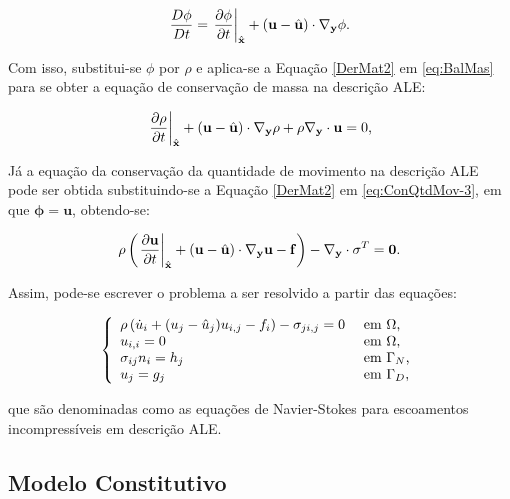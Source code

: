 \documentclass[_ArquivoPrincipal.tex]{subfiles}
\begin{document}
\begin{equation}
    \frac{D\phi}{Dt}=\left.\frac{\partial{\phi}}{\partial{t}}\right|_{\hat{\mathbf{x}}}+(\mathbf{u}-\hat{\mathbf{u}})\cdot\mathbf{\nabla_y}\phi\text{.}\label{DerMat2}
\end{equation}

Com isso, substitui-se $\phi$ por $\rho$ e aplica-se a Equação \ref{DerMat2} em \ref{eq:BalMas} para se obter a equação de conservação de massa na descrição ALE:

\begin{equation}
    \left.\frac{\partial{\rho}}{\partial{t}}\right|_{\hat{\mathbf{x}}}+(\mathbf{u}-\hat{\mathbf{u}})\cdot\mathbf{\nabla_y}\rho+\rho\mathbf{\nabla_y}\cdot\mathbf{u}=0\text{,}
    \label{ConMas4}
\end{equation}

Já a equação da conservação da quantidade de movimento na descrição ALE pode ser obtida substituindo-se a Equação \ref{DerMat2} em \ref{eq:ConQtdMov-3}, em que $\mathbf{\phi}=\mathbf{u}$, obtendo-se:

\begin{equation}
    \rho\left(\left.\frac{\partial{\mathbf{u}}}{\partial{t}}\right|_{\hat{\mathbf{x}}}+(\mathbf{u}-\hat{\mathbf{u}})\cdot\mathbf{\nabla_y}\mathbf{u}-\mathbf{f}\right)-\mathbf{\nabla_y}\cdot\mathbf{\sigma}^T=\mathbf{0}\text{.}
    \label{ConQtdMov10}
\end{equation}

Assim, pode-se escrever o problema a ser resolvido a partir das equações:

\begin{equation}
    \left\{
    \begin{array}{ll}
        \rho\left({\dot{u}_i+(u_j-\hat{u}_j)u_{i,j}-f_i}\right)-\sigma_{ji,j}=0 & \text{ em }\Omega\text{,}   \\
        u_{i,i}=0                                                         & \text{ em }\Omega\text{,}   \\
        \sigma_{ij}n_i=h_j                                                & \text{ em }\Gamma_N\text{,} \\
        u_j=g_j                                                           & \text{ em }\Gamma_D\text{,}
    \end{array}
    \right.\label{eq:NS-ALE}
\end{equation}

\noindent que são denominadas como as equações de Navier-Stokes para escoamentos incompressíveis em descrição ALE.

\subsection{Modelo Constitutivo} \label{MC}
\end{document}

